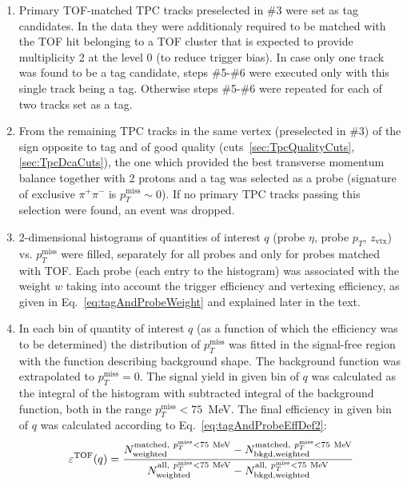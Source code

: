 \begin{enumerate}
 \item Primary TOF-matched TPC tracks preselected in \#3 were set as tag candidates. In the data they were additionaly required to be matched with the TOF hit belonging to a TOF cluster that is expected to provide multiplicity 2 at the level 0 (to reduce trigger bias). In case only one track was found to be a tag candidate, steps \#5-\#6 were executed only with this single track being a tag. Otherwise steps \#5-\#6 were repeated for each of two tracks set as a tag.\\[-20pt]%
 \item From the remaining TPC tracks in the same vertex (preselected in \#3) of the sign opposite to tag and of good quality (cuts~\ref{sec:TpcQualityCuts},\ref{sec:TpcDcaCuts}), the one which provided the best transverse momentum balance together with 2 protons and a tag was selected as a probe (signature of exclusive $\pi^{+}\pi^{-}$ is  $p_{T}^{\text{miss}}\sim0$). If no primary TPC tracks passing this selection were found, an event was dropped.\\[-20pt]%
 \item 2-dimensional histograms of quantities of interest $q$ (probe $\eta$, probe $p_{T}$, $z_{\text{vtx}}$) vs. $p_{T}^{\text{miss}}$ were filled, separately for all probes and only for probes matched with TOF. Each probe (each entry to the histogram) was associated with the weight $w$ taking into account the trigger efficiency and vertexing efficiency, as given in Eq.~\eqref{eq:tagAndProbeWeight} and explained later in the text.\\[-20pt]%
 \item In each bin of quantity of interest $q$ (as a function of which the efficiency was to be determined) the distribution of $p_{T}^{\text{miss}}$ was fitted in the signal-free region with the function describing background shape. The background function was extrapolated to $p_{T}^{\text{miss}}=0$. The signal yield in given bin of $q$ was calculated as the integral of the histogram with subtracted integral of the background function, both in the range $p_{T}^{\text{miss}}<75$~MeV. The final efficiency in given bin of $q$ was calculated according to Eq.~\eqref{eq:tagAndProbeEffDef2}:\vspace{-4pt}
 \begin{equation}\label{eq:tagAndProbeEffDef2}
  \varepsilon^{\text{TOF}}(q) = \frac{N_\text{weighted}^{\text{matched},~p_{T}^{\text{miss}}<75~\text{MeV}} - N_\text{bkgd,weighted}^{\text{matched},~p_{T}^{\text{miss}}<75~\text{MeV}} }{ N_\text{weighted}^{\text{all},~p_{T}^{\text{miss}}<75~\text{MeV}} - N_\text{bkgd,weighted}^{\text{all},~p_{T}^{\text{miss}}<75~\text{MeV}} }\vspace*{-25pt}
 \end{equation}
\end{enumerate}
